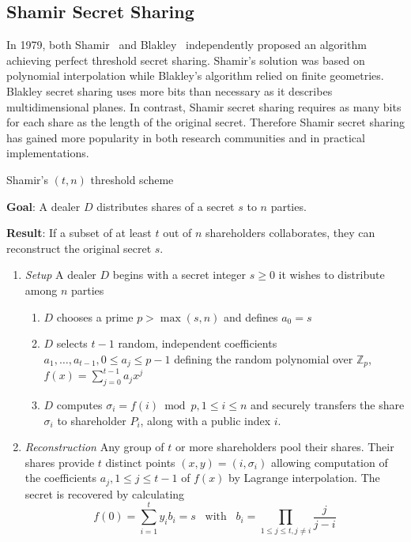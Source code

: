\enlargethispage{\baselineskip}
\subsection{Shamir Secret Sharing}
In 1979, both Shamir~\cite{art:Shamir79} and Blakley~\cite{art:Blakley79} independently proposed an algorithm achieving perfect threshold secret sharing. Shamir's solution was based on polynomial interpolation while Blakley's algorithm relied on finite geometries. Blakley secret sharing uses more bits than necessary as it describes multidimensional planes. In contrast, Shamir secret sharing requires as many bits for each share as the length of the original secret. Therefore Shamir secret sharing has gained more popularity in both research communities and in practical implementations.

\begin{algorithm}
\caption{Shamir's $\left( t, n \right)$ threshold scheme~\cite{book:handbook_of_applied_cryptography} }
\label{alg:shamirs_threshold_sheme}
\begin{description}
 \item \textbf{Goal}: A dealer $D$ distributes shares of a secret $s$ to $n$ parties.
 
 \item \textbf{Result}: If a subset of at least $t$ out of $n$ shareholders collaborates, they can reconstruct the original secret $s$.
\end{description}

 \begin{enumerate}
  \item \textit{Setup} A dealer $D$ begins with a secret integer $s \geq 0$ it wishes to distribute among $n$ parties
   \begin{enumerate}
    \item $D$ chooses a prime $p > \max \left( s, n \right)$ and defines $a_0 = s$
    \item $D$ selects $t-1$ random, independent coefficients $a_1, \ldots, a_{t-1}, 0 \leq a_j \leq p-1$ defining the random polynomial over $\mathbb{Z}_p$, $f \left( x \right) = \sum^{t-1}_{j=0} a_j x^j$
    \item $D$ computes $\sigma_i = f \left( i \right) \bmod p, 1 \leq i \leq n$ and securely transfers the share $\sigma_i$ to shareholder $P_i$, along with a public index $i$.
   \end{enumerate}
   \item \textit{Reconstruction} Any group of $t$ or more shareholders pool their shares. Their shares provide $t$ distinct points $\left( x, y \right) = \left( i, \sigma_i \right)$ allowing computation of the coefficients $a_j, 1 \leq j \leq t-1$ of $f \left( x \right)$ by Lagrange interpolation. The secret is recovered by calculating
 \begin{equation*}
  f \left( 0 \right) = \sum^t_{i=1}y_i b_i = s \; \; \; \textrm{with} \; \; \; b_i = \prod_{1 \leq j \leq t, j \neq i} \frac{j}{j-i}
 \end{equation*}
 \end{enumerate}
\end{algorithm}

